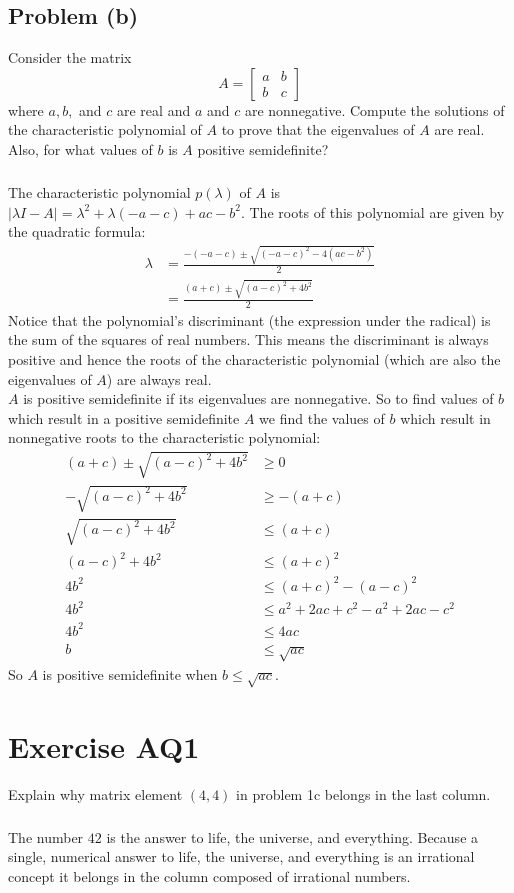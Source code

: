 \documentclass[11pt]{article}
\begin{document}
\subsection*{Problem (b)}
Consider the matrix
\begin{equation*}
	A=\begin{bmatrix} a & b \\ b & c \end{bmatrix}
\end{equation*}
where $a,b,$ and $c$ are real and $a$ and $c$ are nonnegative. Compute the solutions of the characteristic polynomial of $A$ to prove that the eigenvalues of $A$ are real. Also, for what values of $b$ is $A$ positive semidefinite?
\subparagraph*{}
The characteristic polynomial $p(\lambda)$ of $A$ is $|\lambda I - A| = \lambda^2 + \lambda(-a-c) + ac - b^2$. The roots of this polynomial are given by the quadratic formula:
\begin{align*}
	\lambda &= \frac{-(-a-c)\pm\sqrt{(-a-c)^2-4(ac-b^2)}}{2} \\
	&= \frac{(a+c)\pm\sqrt{(a-c)^2+4b^2}}{2}
\end{align*}
Notice that the polynomial's discriminant (the expression under the radical) is the sum of the squares of real numbers. This means the discriminant is always positive and hence the roots of the characteristic polynomial (which are also the eigenvalues of $A$) are always real.\\

$A$ is positive semidefinite if its eigenvalues are nonnegative. So to find values of $b$ which result in a positive semidefinite $A$ we find the values of $b$ which result in nonnegative roots to the characteristic polynomial:
\begin{align*}
	(a+c)\pm\sqrt{(a-c)^2+4b^2} &\geq 0 \\
	-\sqrt{(a-c)^2+4b^2} &\geq -(a+c) \\
	\sqrt{(a-c)^2+4b^2} &\leq (a+c) \\
	(a-c)^2+4b^2 &\leq (a+c)^2 \\
	4b^2 &\leq (a+c)^2 - (a-c)^2 \\
	4b^2 &\leq a^2+2ac+c^2-a^2+2ac-c^2 \\
	4b^2 &\leq 4ac \\
	b &\leq \sqrt{ac}
\end{align*}
So $A$ is positive semidefinite when $b\leq\sqrt{ac}$.

\section*{Exercise AQ1}
Explain why matrix element $(4,4)$ in problem 1c belongs in the last column.
\subparagraph*{}
The number $42$ is the answer to life, the universe, and everything. Because a single, numerical answer to life, the universe, and everything is an irrational concept it belongs in the column composed of irrational numbers.
\end{document}
